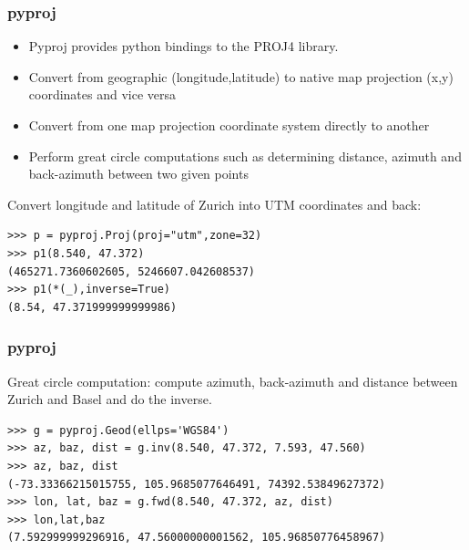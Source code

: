 \begin{frame}[fragile]
\frametitle{pyproj}
\begin{itemize}
  \item Pyproj provides python bindings to the PROJ4 library.
  \item Convert from geographic (longitude,latitude)
	to native map projection (x,y) coordinates and vice versa
   \item Convert from one map projection coordinate system directly to another
   \item Perform great circle computations such as determining distance, azimuth
   and back-azimuth between two given points
\end{itemize}

Convert longitude and latitude of Zurich into UTM coordinates and back:
 \begin{myColorBox}{0.9}{}
\begin{verbatim}
>>> p = pyproj.Proj(proj="utm",zone=32)
>>> p1(8.540, 47.372)
(465271.7360602605, 5246607.042608537)
>>> p1(*(_),inverse=True)
(8.54, 47.371999999999986)
\end{verbatim}
\end{myColorBox}
\end{frame}

\begin{frame}[fragile]
\frametitle{pyproj}
Great circle computation: compute azimuth, back-azimuth and distance between
Zurich and Basel and do the inverse.
\begin{myColorBox}{1.0}{}
\begin{verbatim}
>>> g = pyproj.Geod(ellps='WGS84')
>>> az, baz, dist = g.inv(8.540, 47.372, 7.593, 47.560)
>>> az, baz, dist
(-73.33366215015755, 105.9685077646491, 74392.53849627372)
>>> lon, lat, baz = g.fwd(8.540, 47.372, az, dist)
>>> lon,lat,baz
(7.592999999296916, 47.56000000001562, 105.96850776458967)
\end{verbatim}
\end{myColorBox}
\end{frame}

